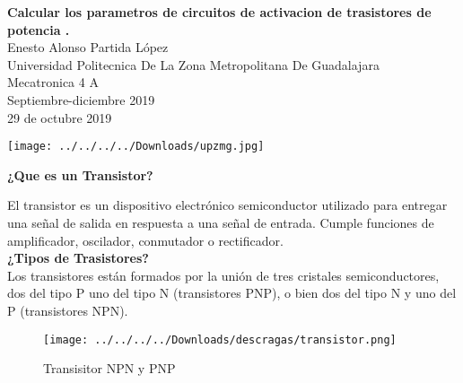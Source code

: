 \documentclass[12pt]{report}
\begin{document}
\begin{center}
{\Huge \textbf{Calcular los parametros de circuitos de activacion de trasistores de potencia  .}\\}
\Large{Enesto Alonso Partida López\\ Universidad Politecnica De La Zona Metropolitana De Guadalajara\\ Mecatronica 4 A\\ Septiembre-diciembre 2019}\\
{29 de octubre 2019 }\\
\end{center}
\begin{center}


\texttt{[image: ../../../../Downloads/upzmg.jpg]} 
\end{center}
\newpage
{\huge \textbf{¿Que es un Transistor?}\\}


{\Large El transistor es un dispositivo electrónico semiconductor utilizado para entregar una señal de salida en respuesta a una señal de entrada. Cumple funciones de amplificador, oscilador, conmutador o rectificador. }\\



{\huge \textbf{¿Tipos de Trasistores?  }}\\

{\Large Los transistores están formados por la unión de tres cristales semiconductores, dos del tipo P uno del tipo N (transistores PNP), o bien dos del tipo N y uno del P (transistores NPN). }\\
\begin{center}
\begin{figure}[hbtp]
\caption{Transisitor NPN y PNP}
\centering
\texttt{[image: ../../../../Downloads/descragas/transistor.png]}
\end{figure}

\end{center}
\end{document}

